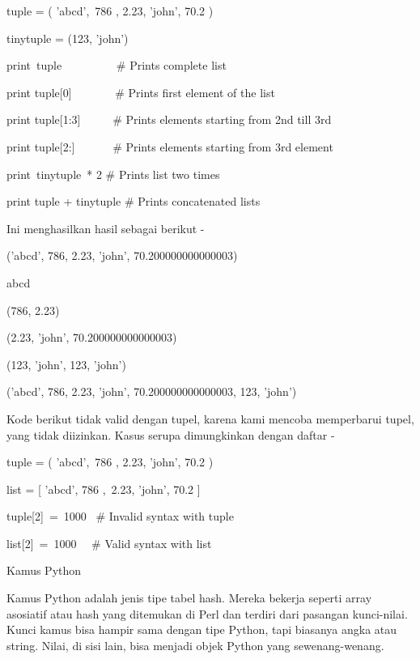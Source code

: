 \noindent 
tuple = ( 'abcd',~786 , 2.23, 'john', 70.2  ) \par
\noindent 
tinytuple = (123, 'john') \par
\vspace{12pt}
\noindent 
print~tuple~~~~~~~~~   $  \#  $ Prints complete list \par
\noindent 
print tuple[0]~~~~~~~  $  \#  $ Prints first element of the list \par
\noindent 
print tuple[1:3]~~~~~  $  \#  $ Prints elements starting from 2nd till 3rd  \par
\noindent 
print tuple[2:]~~~~~~  $  \#  $ Prints elements starting from 3rd element \par
\noindent 
print~tinytuple~* 2    $  \#  $ Prints list two times \par
\noindent 
print tuple + tinytuple  $  \#  $ Prints concatenated lists \par
\noindent 
Ini menghasilkan hasil sebagai berikut - \par
\noindent 
('abcd', 786, 2.23, 'john', 70.200000000000003) \par
\noindent 
abcd \par
\noindent 
(786, 2.23) \par
\noindent 
(2.23, 'john', 70.200000000000003) \par
\noindent 
(123, 'john', 123, 'john') \par
\noindent 
('abcd', 786, 2.23, 'john', 70.200000000000003, 123, 'john') \par
\vspace{12pt}
\noindent 
Kode berikut tidak valid dengan tupel, karena kami mencoba memperbarui tupel, yang tidak diizinkan. $  $Kasus serupa dimungkinkan dengan daftar - \par
\vspace{12pt}
\noindent 
tuple = ( 'abcd',~786 , 2.23, 'john', 70.2  ) \par
\noindent 
list = [ 'abcd', 786 ,~2.23, 'john', 70.2  ] \par
\noindent 
tuple[2]~=~1000~    $  \#  $ Invalid syntax with tuple \par
\noindent 
list[2]~=~1000~~    $  \#  $ Valid syntax with list \par
\vspace{12pt}
\noindent 
Kamus Python \par
\vspace{12pt}
\noindent 
Kamus Python adalah jenis tipe tabel hash. $  $Mereka bekerja seperti array asosiatif atau hash yang ditemukan di Perl dan terdiri dari pasangan kunci-nilai. $  $Kunci kamus bisa hampir sama dengan tipe Python, tapi biasanya angka atau string. $  $Nilai, di sisi lain, bisa menjadi objek Python yang sewenang-wenang. \par
